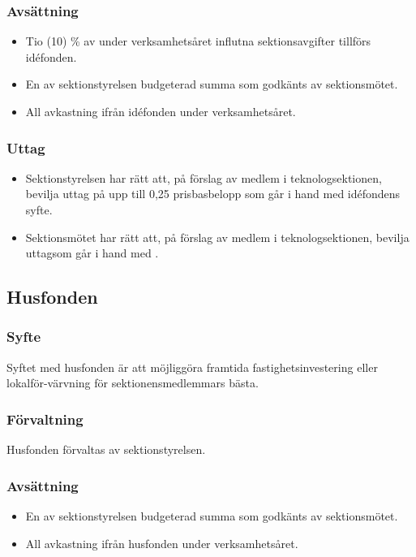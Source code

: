 \documentclass[a4paper]{dtek}
\begin{document}
\subsubsection{Avsättning}
\begin{itemize}
\item Tio (10) \% av under verksamhetsåret influtna sektionsavgifter tillförs idéfonden.
\item En av sektionstyrelsen budgeterad summa som godkänts av sektionsmötet.
\item All avkastning ifrån idéfonden under verksamhetsåret.
\end{itemize}
\subsubsection{Uttag}
\begin{itemize}
  \item Sektionstyrelsen har rätt att, på förslag av medlem i teknologsektionen, bevilja uttag på upp till 0,25 prisbasbelopp som går i hand med idéfondens syfte.
  \item Sektionsmötet har rätt att, på förslag av medlem i teknologsektionen, bevilja uttagsom går i hand med .
\end{itemize}

\subsection{Husfonden}
\subsubsection{Syfte}
\label{sec:husfond_syfte}
Syftet med husfonden är att möjliggöra framtida fastighetsinvestering eller lokalför-värvning för sektionensmedlemmars bästa.
\subsubsection{Förvaltning}
Husfonden förvaltas av sektionstyrelsen.
\subsubsection{Avsättning}
\begin{itemize}
  \item En av sektionstyrelsen budgeterad summa som godkänts av sektionsmötet.
  \item All avkastning ifrån husfonden under verksamhetsåret.
\end{itemize}
\end{document}
